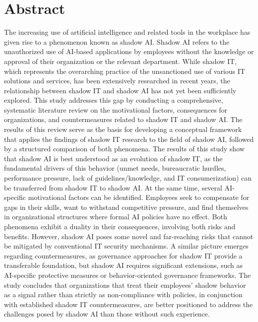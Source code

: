 \documentclass[12pt,oneside]{article}
\begin{document}
\newpage
{}
\section*{Abstract}

The increasing use of artificial intelligence and related tools in the workplace has given rise to a phenomenon known as shadow AI. Shadow AI refers to the unauthorized use of AI-based applications by employees without the knowledge or approval of their organization or the relevant department. While shadow IT, which represents the overarching practice of the unsanctioned use of various IT solutions and services, has been extensively researched in recent years, the relationship between shadow IT and shadow AI has not yet been sufficiently explored. This study addresses this gap by conducting a comprehensive, systematic literature review on the motivational factors, consequences for organizations, and countermeasures related to shadow IT and shadow AI. The results of this review serve as the basis for developing a conceptual framework that applies the findings of shadow IT research to the field of shadow AI, followed by a structured comparison of both phenomena. The results of this study show that shadow AI is best understood as an evolution of shadow IT, as the fundamental drivers of this behavior (unmet needs, bureaucratic hurdles, performance pressure, lack of guidelines/knowledge, and IT consumerization) can be transferred from shadow IT to shadow AI. At the same time, several AI-specific motivational factors can be identified. Employees seek to compensate for gaps in their skills, want to withstand competitive pressure, and find themselves in organizational structures where formal AI policies have no effect. Both phenomena exhibit a duality in their consequences, involving both risks and benefits. However, shadow AI poses some novel and far-reaching risks that cannot be mitigated by conventional IT security mechanisms. A similar picture emerges regarding countermeasures, as governance approaches for shadow IT provide a transferable foundation, but shadow AI requires significant extensions, such as AI-specific protective measures or behavior-oriented governance frameworks. The study concludes that organizations that treat their employees' shadow behavior as a signal rather than strictly as non-compliance with policies, in conjunction with established shadow IT countermeasures, are better positioned to address the challenges posed by shadow AI than those without such experience.
\end{document}
